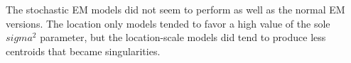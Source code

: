 The stochastic EM models did not seem to perform as well as the normal EM versions.
The location only models tended to favor a high value of the sole $sigma^2$ parameter, 
but the location-scale models did tend to produce less centroids that became singularities.
